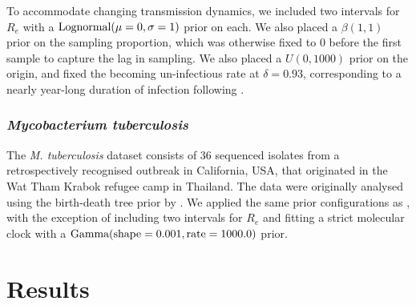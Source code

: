 \documentclass[12pt]{article}
\begin{document}
\begin{spacing}{2}
To accommodate changing transmission dynamics, we included two intervals for $R_e$ with a $\textnormal{Lognormal}(\mu=0,\sigma=1)$ prior on each. We also placed a $\beta(1,1)$ prior on the sampling proportion, which was otherwise fixed to 0 before the first sample to capture the lag in sampling. We also placed a $U(0,1000)$ prior on the origin, and fixed the becoming un-infectious rate at $\delta=0.93$, corresponding to a nearly year-long duration of infection following \citet{volz_modeling_2018}.

\subsubsection*{\textit{Mycobacterium tuberculosis}}
The \textit{M. tuberculosis} dataset consists of 36 sequenced isolates from a retrospectively recognised outbreak in California, USA, that originated in the Wat Tham Krabok refugee camp in Thailand. The data were originally analysed using the birth-death tree prior by \citet{kuhnert_tuberculosis_2018}. We applied the same prior configurations as \citet{kuhnert_tuberculosis_2018}, with the exception of including two intervals for $R_e$ and fitting a strict molecular clock with a $\textnormal{Gamma}(\textnormal{shape}=0.001,\textnormal{rate}=1000.0)$ prior.

\section*{Results}

\end{spacing}
\end{document}
